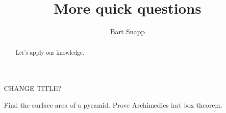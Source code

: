 \documentclass[handout,nooutcomes,noauthor]{ximera}
\title{More quick questions}
\author{Bart Snapp}
\begin{document}
\begin{abstract}
  Let's apply our knowledge.
\end{abstract}
\maketitle


\begin{listOutcomes}
\item 
\end{listOutcomes}


\mynewpage



CHANGE TITLE?

Find the surface area of a pyramid.
Prove Archimedies hat box theorem.

\begin{question}
  
\end{question}

\mynewpage


\begin{question}
  
\end{question}

\mynewpage


\begin{question}
  
\end{question}
\end{document}

